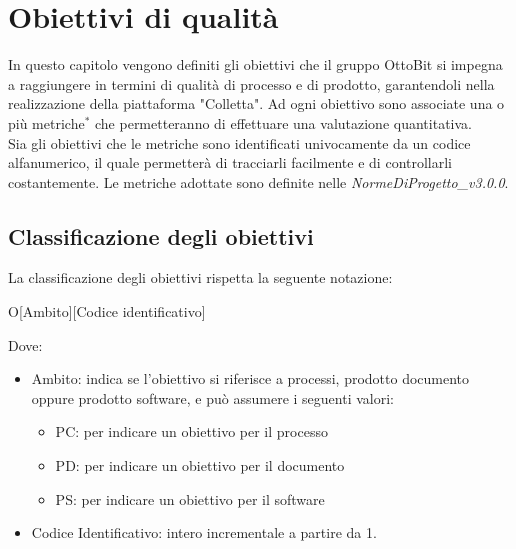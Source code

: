 \section{Obiettivi di qualità}
In questo capitolo vengono definiti gli obiettivi che il gruppo OttoBit si impegna a raggiungere in termini di qualità di processo e di prodotto, garantendoli nella realizzazione della piattaforma "Colletta". Ad ogni obiettivo sono associate una o più metriche$^*$ che permetteranno di effettuare una valutazione quantitativa. \\
Sia gli obiettivi che le metriche sono identificati univocamente da un codice alfanumerico, il quale permetterà di tracciarli facilmente e di controllarli costantemente. Le metriche adottate sono definite nelle \textit{NormeDiProgetto\_v3.0.0}.

\subsection{Classificazione degli obiettivi}
La classificazione degli obiettivi rispetta la seguente notazione:
\begin{center}
	O[Ambito][Codice identificativo]
\end{center}

Dove:
\begin{itemize}
	\item Ambito: indica se l'obiettivo si riferisce a processi, prodotto documento oppure prodotto software, e può assumere i seguenti valori:
	\begin{itemize}
		\item PC: per indicare un obiettivo per il processo
		\item PD: per indicare un obiettivo per il documento
		\item PS: per indicare un obiettivo per il software
	\end{itemize}
	
	\item Codice Identificativo: intero incrementale a partire da 1.
	
\end{itemize}

